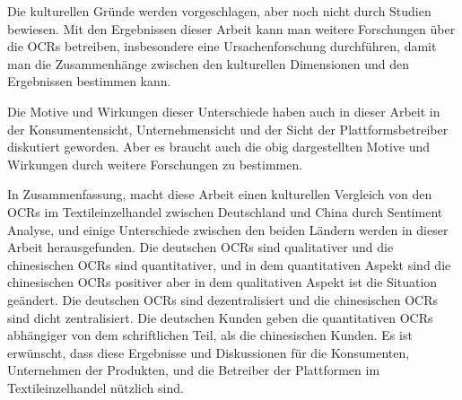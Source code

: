 Die kulturellen Gründe werden vorgeschlagen, aber noch nicht durch Studien bewiesen. Mit den Ergebnissen dieser Arbeit kann man weitere Forschungen über die \acl{OCRs} betreiben, insbesondere eine Ursachenforschung durchführen, damit man die Zusammenhänge zwischen den kulturellen Dimensionen und den Ergebnissen bestimmen kann.

Die Motive und Wirkungen dieser Unterschiede haben auch in dieser Arbeit in der Konsumentensicht, Unternehmensicht und der Sicht der Plattformsbetreiber diskutiert geworden. Aber es braucht auch die obig dargestellten Motive und Wirkungen durch weitere Forschungen zu bestimmen.

In Zusammenfassung, macht diese Arbeit einen kulturellen Vergleich von den \acl{OCRs} im Textileinzelhandel zwischen Deutschland und China durch Sentiment Analyse, und einige Unterschiede zwischen den beiden Ländern werden in dieser Arbeit herausgefunden. Die deutschen \acl{OCRs} sind qualitativer und die chinesischen \acl{OCRs} sind quantitativer, und in dem quantitativen Aspekt sind die chinesischen \acl{OCRs} positiver aber in dem qualitativen Aspekt ist die Situation geändert. Die deutschen \acl{OCRs} sind dezentralisiert und die chinesischen \acl{OCRs} sind dicht zentralisiert. Die deutschen Kunden geben die quantitativen \acl{OCRs} abhängiger von dem schriftlichen Teil, als die chinesischen Kunden. Es ist erwünscht, dass diese Ergebnisse und Diskussionen für die Konsumenten, Unternehmen der Produkten, und die Betreiber der Plattformen im Textileinzelhandel nützlich sind.
